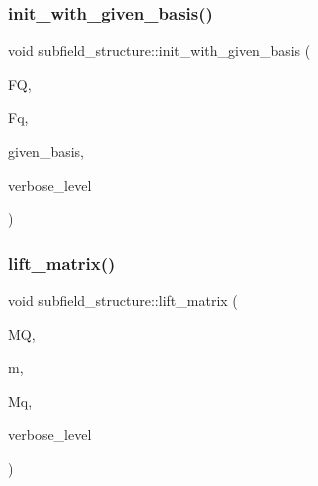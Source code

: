 \mbox{\label{classsubfield__structure_ac6d44abb857dd6eb3a2d34d750f061a9}} 
\subsubsection{\texorpdfstring{init\+\_\+with\+\_\+given\+\_\+basis()}{init\_with\_given\_basis()}}
{\footnotesize\ttfamily void subfield\+\_\+structure\+::init\+\_\+with\+\_\+given\+\_\+basis (\begin{DoxyParamCaption}\item[{\mbox{\hyperlink{classfinite__field}{finite\+\_\+field}} $\ast$}]{FQ,  }\item[{\mbox{\hyperlink{classfinite__field}{finite\+\_\+field}} $\ast$}]{Fq,  }\item[{\mbox{\hyperlink{galois_8h_a09fddde158a3a20bd2dcadb609de11dc}{I\+NT}} $\ast$}]{given\+\_\+basis,  }\item[{\mbox{\hyperlink{galois_8h_a09fddde158a3a20bd2dcadb609de11dc}{I\+NT}}}]{verbose\+\_\+level }\end{DoxyParamCaption})}

\mbox{\label{classsubfield__structure_aaebeb29f45ee9b8c43568fef05475c48}} 
\subsubsection{\texorpdfstring{lift\+\_\+matrix()}{lift\_matrix()}}
{\footnotesize\ttfamily void subfield\+\_\+structure\+::lift\+\_\+matrix (\begin{DoxyParamCaption}\item[{\mbox{\hyperlink{galois_8h_a09fddde158a3a20bd2dcadb609de11dc}{I\+NT}} $\ast$}]{MQ,  }\item[{\mbox{\hyperlink{galois_8h_a09fddde158a3a20bd2dcadb609de11dc}{I\+NT}}}]{m,  }\item[{\mbox{\hyperlink{galois_8h_a09fddde158a3a20bd2dcadb609de11dc}{I\+NT}} $\ast$}]{Mq,  }\item[{\mbox{\hyperlink{galois_8h_a09fddde158a3a20bd2dcadb609de11dc}{I\+NT}}}]{verbose\+\_\+level }\end{DoxyParamCaption})}

